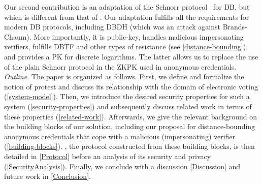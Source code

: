 Our second contribution is an adaptation of the Schnorr protocol~\cite{Schnorr} 
for \ac{DB}, but which is different from that of \textcite{DistanceBounding}.
Our adaptation fulfills all the requirements for modern \ac{DB} protocols, including \ac{DBDH} (which was an attack against Brands-Chaum).
More importantly, it is public-key, handles malicious impersonating verifiers, fulfills \ac{DBTF} and other types of resistance (see \cref{distance-bounding}), and provides a \ac{PK} for discrete logarithms.
The latter allows us to replace the use of the plain Schnorr protocol in the \ac{ZKPK} used in anonymous credentials.
\emph{Outline.} 
The paper is organized as follows. 
First, we define and formalize the notion of protest and discuss its relationship with the domain of electronic voting (\cref{system-model}).  
Then, we introduce the desired security properties for such a system (\cref{security-properties}) and subsequently discuss related work in 
terms of these properties (\cref{related-work}). 
Afterwards, we give the relevant background on the building blocks of our solution, including our proposal for distance-bounding anonymous credentials that cope with a malicious (impersonating) verifier (\cref{building-blocks}). 
\PRIVO, the protocol constructed from these building blocks, is then detailed in \cref{Protocol} before an analysis of its security and privacy (\cref{SecurityAnalysis}). 
Finally, we conclude with a discussion \cref{Discussion} and future work in \cref{Conclusion}.
